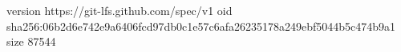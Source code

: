 version https://git-lfs.github.com/spec/v1
oid sha256:06b2d6e742e9a6406fcd97db0c1e57c6afa26235178a249ebf5044b5c474b9a1
size 87544
